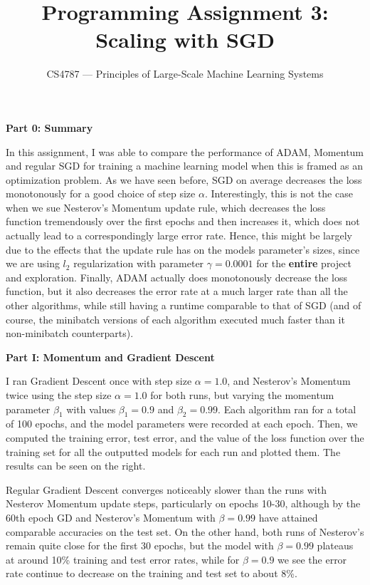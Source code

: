 \documentclass[10pt]{article}
\begin{document}
\nobibliography*

\title{Programming Assignment 3: Scaling with SGD}
\author{CS4787 --- Principles of Large-Scale Machine Learning Systems}
\date{}

\maketitle
\begin{multicols}{2} 
\noindent
\textbf{Part 0: Summary} \par
In this assignment, I was able to compare the performance of ADAM, Momentum and regular SGD for training a machine learning model when this is framed as an optimization problem. As we have seen before, SGD on average decreases the loss monotonously for a good choice of step size $\alpha$. Interestingly, this is not the case when we sue Nesterov's Momentum update rule, which decreases the loss function tremendously over the first epochs and then increases it, which does not actually lead to a correspondingly large error rate. Hence, this might be largely due to the effects that the update rule has on the models parameter's sizes, since we are using $l_2$ regularization with parameter $\gamma= 0.0001$ for the \textbf{entire} project and exploration. Finally, ADAM actually does monotonously decrease the loss function, but it also decreases the error rate at a much larger rate than all the other algorithms, while still having a runtime comparable to that of SGD (and of course, the minibatch versions of each algorithm executed much faster than it non-minibatch counterparts).\par 
\noindent
\textbf{Part I: Momentum and Gradient Descent}\par I ran Gradient Descent once with step size $\alpha = 1.0$, and Nesterov's Momentum twice using the step size $\alpha = 1.0$ for both runs, but varying the momentum parameter $\beta_1$ with values $\beta_1=0.9$ and $\beta_2 = 0.99$. Each algorithm ran for a total of 100 epochs, and the model parameters were recorded at each epoch. Then, we computed the training error, test error, and the value of the loss function over the training set for all the outputted models for each run and plotted them. The results can be seen on the right. \par
Regular Gradient Descent converges noticeably slower than the runs with Nesterov Momentum update steps, particularly on epochs 10-30, although by the 60th epoch GD and Nesterov's Momentum with $\beta=0.99$ have attained comparable accuracies on the test set. On the other hand, both runs of Nesterov's remain quite close for the first 30 epochs, but the model with $\beta=0.99$ plateaus at around 10\% training and test error rates, while for $\beta=0.9$ we see the error rate continue to decrease on the training and test set to about 8\%.\par 

\end{multicols}
\end{document}
